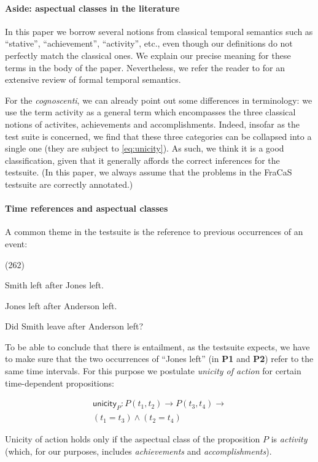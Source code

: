 \documentclass[a4paper,11pt]{article}
\newcommand\hyp{\item[H]}
\newcommand\fracasex[2]{\begin{lingex}\item[(#1)] \begin{subex} #2 \end{subex} \end{lingex} }
\newcommand\constant[1]{\mathsf{#1}}
\begin{document}
\paragraph{Aside: aspectual classes in the literature}
In this paper we borrow several notions from classical temporal
semantics such as ``stative'', ``achievement'', ``activity'', etc.,
even though our definitions do not perfectly match the classical
ones. We explain our precise meaning for these terms in the body of the
paper. Nevertheless, we refer the reader to \citet{steedman:2000} for
an extensive review of formal temporal semantics.

For the \textit{cognoscenti}, we can already point out some
differences in terminology: we use the term activity as a general term
which encompasses the three classical notions of activites,
achievements and accomplishments. Indeed, insofar as the test suite is
concerned, we find that these three categories can be collapsed into a
single one (they are subject to \cref{eq:unicity}).  As such, we think
it is a good classification, given that it generally affords the
correct inferences for the testsuite. (In this paper, we always assume
that the problems in the FraCaS testsuite are correctly annotated.)

\paragraph{Time references and aspectual classes}

A common theme in the testsuite is the reference to previous
occurrences of an event:

\fracasex{262}{
\item	Smith left after Jones left.
\item	Jones left after Anderson left.
\hyp 	Did Smith leave after Anderson left?
}

To be able to conclude that there is entailment, as the testsuite expects, we have to make sure
that the two occurrences of ``Jones left'' (in \textbf{P1} and \textbf{P2}) refer to the
same time intervals.
%
For this purpose we postulate \emph{unicity of action} for certain time-dependent
propositions:

\begin{multline}
  \constant{unicity}_P : P (t_1,t_2) → P (t_3,t_4) → \\ (t_1 = t_3) ∧ (t_2 = t_4)
  \label{eq:unicity}
\end{multline}

Unicity of action holds only if the aspectual class of the proposition
$P$ is \emph{activity}~\citep{steedman_productions_2000} (which, for our
purposes, includes \emph{achievements} and \emph{accomplishments}).
\end{document}
